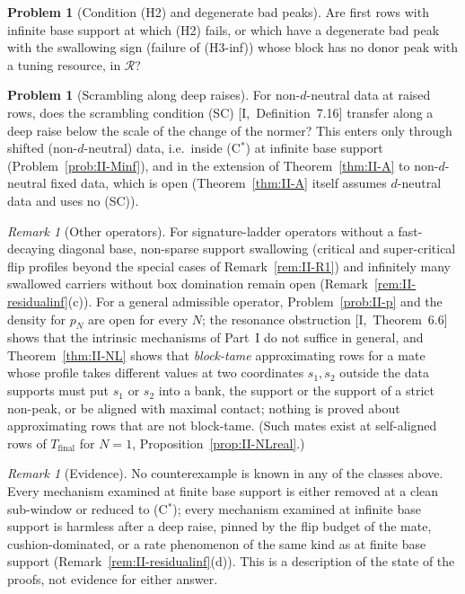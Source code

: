 \documentclass[10pt]{amsart}
\theoremstyle{definition}
\newtheorem{problem}[theorem]{Problem}
\theoremstyle{remark}
\newtheorem{remark}[theorem]{Remark}
\newcommand{\Rec}{\mathcal R}
\begin{document}
\begin{problem}[Condition (H2) and degenerate bad peaks]\label{prob:II-H2}
Are first rows with infinite base support at which (H2) fails, or which
have a degenerate bad peak with the swallowing sign (failure of
(H3-inf)) whose block has no donor peak with a tuning resource, in
$\Rec$?
\end{problem}

\begin{problem}[Scrambling along deep raises]\label{prob:II-SCdeep}
For non-$d$-neutral data at raised rows, does the scrambling condition
(SC) [I,~Definition~7.16] transfer along a deep raise below the scale of
the change of the normer?  This enters only through shifted
(non-$d$-neutral) data, i.e.\ inside (C$^*$) at infinite base support
(Problem~\ref{prob:II-Minf}), and in the extension of Theorem~\ref{thm:II-A}
to non-$d$-neutral fixed data, which is open (Theorem~\ref{thm:II-A} itself
assumes $d$-neutral data and uses no (SC)).
\end{problem}

\begin{remark}[Other operators]\label{rem:II-statusother}
For signature-ladder operators without a fast-decaying diagonal base,
non-sparse support swallowing (critical and super-critical flip profiles
beyond the special cases of Remark~\ref{rem:II-R1}) and infinitely many
swallowed carriers without box domination remain open
(Remark~\ref{rem:II-residualinf}(c)).  For a general admissible operator,
Problem~\ref{prob:II-p} and the density for $p_N$ are open for every $N$;
the resonance obstruction [I,~Theorem~6.6] shows that the intrinsic
mechanisms of Part~I do not suffice in general, and Theorem~\ref{thm:II-NL}
shows that \emph{block-tame} approximating rows for a mate whose profile
takes different values at two coordinates $s_1,s_2$ outside the data
supports must put $s_1$ or $s_2$ into a bank, the support or the support of
a strict non-peak, or be aligned with maximal contact; nothing is proved
about approximating rows that are not block-tame.  (Such mates exist at
self-aligned rows of $T_{\mathrm{final}}$ for $N=1$,
Proposition~\ref{prop:II-NLreal}.)
\end{remark}

\begin{remark}[Evidence]\label{rem:II-evidence}
No counterexample is known in any of the classes above.  Every mechanism
examined at finite base support is either removed at a clean sub-window
or reduced to (C$^*$); every mechanism examined at infinite base support
is harmless after a deep raise, pinned by the flip budget of the mate,
cushion-dominated, or a rate phenomenon of the same kind as at finite base
support (Remark~\ref{rem:II-residualinf}(d)).  This is a description of the
state of the proofs, not evidence for either answer.
\end{remark}
\end{document}
